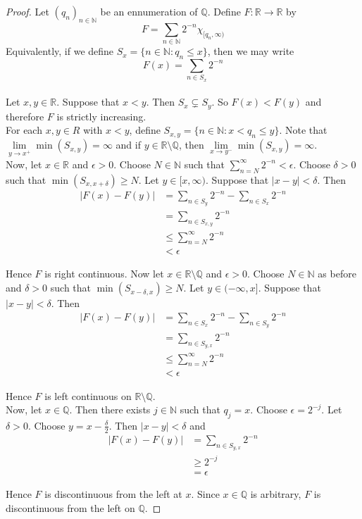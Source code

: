 \documentclass[12pt]{amsart}
\theoremstyle{definition}
\newcommand{\del}{\delta}
\newcommand{\ep}{\epsilon}
\newcommand{\N}{\mathbb{N}}
\newcommand{\R}{\mathbb{R}}
\newcommand{\Q}{\mathbb{Q}}
\begin{document}
	\begin{proof}
		Let $(q_n)_{n\in \N}$ be an ennumeration of $\Q$. Define $F:\R \rightarrow \R$ by $$F =\sum_{n\in \N} 2^{-n}\chi_{[q_n, \infty)}$$ 
		Equivalently, if we define $S_x=\{n \in \N: q_n \leq x\}$, then we may write $$F(x) = \sum_{n \in S_x}2^{-n}$$\\ Let $x, y \in \R$. Suppose that $x < y$. Then $S_x \subsetneq S_y$. So $F(x)<F(y)$ and therefore $F$ is strictly increasing.\\ 
		For each $x,y \in R$ with $x<y$, define $S_{x,y}= \{n \in \N:x< q_n \leq y\}$. Note that $\lim\limits_{y\rightarrow x^+}\min(S_{x,y}) = \infty$ and if $y \in \R \setminus \Q$, then $\lim\limits_{x\rightarrow y^-}\min(S_{x,y}) = \infty$.\\
		Now, let $x \in \R$ and $\ep>0$. Choose $N \in \N$ such that $\sum\limits_{n = N}^{\infty}2^{-n}<\ep$. Choose $\del>0$ such that $\min (S_{x,x+\del}) \geq N$.  Let $y \in [x,\infty)$. Suppose that $|x-y| < \del$. Then 
		\begin{align*}
			|F(x)-F(y)| 
			&= \sum_{n \in S_y}2^{-n} - \sum_{n \in S_x}2^{-n}\\
			& = \sum_{n \in S_{x,y}}2^{-n}\\
			& \leq \sum_{n=N}^{\infty}2^{-n}\\
			&<\ep
		\end{align*} 
		
		Hence $F$ is right continuous. Now let $x \in \R\setminus \Q$ and $\ep>0$. Choose $N \in \N$ as before and $\del>0$ such that $\min(S_{x-\del,x})\geq N$. Let $y \in (-\infty, x]$. Suppose that $|x-y|<\del$. Then 
		\begin{align*}
			|F(x)-F(y)| 
			&= \sum_{n \in S_x}2^{-n} - \sum_{n \in S_y}2^{-n}\\
			& = \sum_{n \in S_{y,x}}2^{-n}\\
			& \leq \sum_{n=N}^{\infty}2^{-n}\\
			&<\ep
		\end{align*}
		
		Hence $F$ is left continuous on $\R\setminus \Q$.\\
		Now, let $x \in \Q$. Then there exists $j \in \N$ such that $q_j=x$. Choose $\ep=2^{-j}$. Let $\del>0$. Choose $y=x-\frac{\del}{2}$. Then $|x-y|< \del$ and 
		\begin{align*}
			|F(x)-F(y)|
			&= \sum_{n \in S_{y,x}}2^{-n}\\
			&\geq 2^{-j}\\
			&= \ep
		\end{align*}
		
		Hence $F$ is discontinuous from the left at $x$. Since $x \in \Q$ is arbitrary, $F$ is discontinuous from the left on $\Q$.  
	\end{proof}
	
\end{document}
